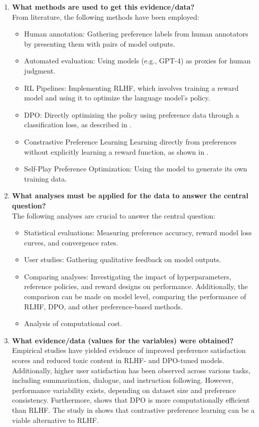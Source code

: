 \documentclass[a4paper,oneside,10pt,ngerman,english]{scrartcl}
\begin{document}
\begin{enumerate}
    \item \textbf{What methods are used to get this evidence/data?} \\
    From literature, the following methods have been employed: 
    \begin{itemize}
        \item Human annotation: Gathering preference labels from human annotators by presenting them with pairs of model outputs. 
        \item Automated evaluation: Using models (e.g., GPT-4) as proxies for human judgment. 
        \item RL Pipelines: Implementing RLHF, which involves training a reward model and using it to optimize the language model's policy.
        \item  DPO: Directly optimizing the policy using preference data through a classification loss, as described in \cite{bib:Rafailov2023}.
        \item Constrastive Preference Learning Learning directly from preferences without explicitly learning a reward function, as shown in \cite{bib:Zhao2023}.
        \item Self-Play Preference Optimization: Using the model to generate its own training data.
    \end{itemize}

    \item \textbf{What analyses must be applied for the data to answer the central question?} \\
    The following analyses are crucial to answer the central question:
    \begin{itemize}
        \item Statistical evaluations: Measuring preference accuracy, reward model loss curves, and convergence rates.
        \item User studies: Gathering qualitative feedback on model outputs.
        \item Comparing analyses: Investigating the impact of hyperparameters, reference policies, and reward designs on performance. Additionally, the comparison can be made on model level, comparing the performance of RLHF, DPO, and other preference-based methods.
        \item Analysis of computational cost.
    \end{itemize}

    \item \textbf{What evidence/data (values for the variables) were obtained?} \\
    Empirical studies have yielded evidence of improved preference satisfaction scores and reduced toxic content in RLHF- and DPO-tuned models. Additionally, higher user satisfaction has been observed across various tasks, including summarization, dialogue, and instruction following. However, performance variability exists, depending on dataset size and preference consistency. Furthermore, \cite{bib:Rafailov2023} shows that DPO is more computationally efficient than RLHF. The study in \cite{bib:Zhao2023} shows that contrastive preference learning can be a viable alternative to RLHF.


\end{enumerate}
\end{document}

